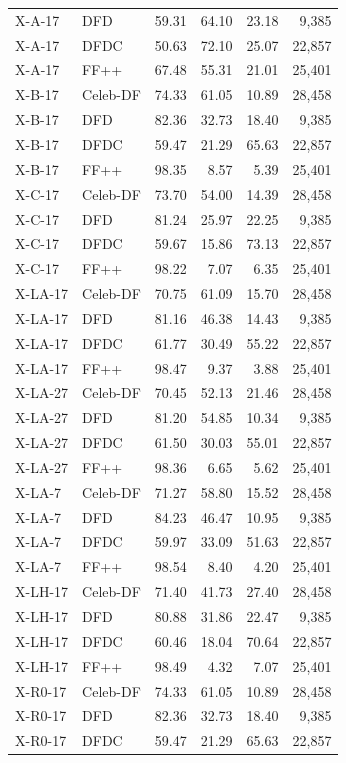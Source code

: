 \documentclass[10pt]{article}
\begin{document}
{\begin{longtable}{llrrrr}
X-A-17 & DFD & 59.31 & 64.10 & 23.18 & 9,385\\
X-A-17 & DFDC & 50.63 & 72.10 & 25.07 & 22,857\\
X-A-17 & FF++ & 67.48 & 55.31 & 21.01 & 25,401\\
X-B-17 & Celeb-DF & 74.33 & 61.05 & 10.89 & 28,458\\
X-B-17 & DFD & 82.36 & 32.73 & 18.40 & 9,385\\
X-B-17 & DFDC & 59.47 & 21.29 & 65.63 & 22,857\\
X-B-17 & FF++ & 98.35 & 8.57 & 5.39 & 25,401\\
X-C-17 & Celeb-DF & 73.70 & 54.00 & 14.39 & 28,458\\
X-C-17 & DFD & 81.24 & 25.97 & 22.25 & 9,385\\
X-C-17 & DFDC & 59.67 & 15.86 & 73.13 & 22,857\\
X-C-17 & FF++ & 98.22 & 7.07 & 6.35 & 25,401\\
X-LA-17 & Celeb-DF & 70.75 & 61.09 & 15.70 & 28,458\\
X-LA-17 & DFD & 81.16 & 46.38 & 14.43 & 9,385\\
X-LA-17 & DFDC & 61.77 & 30.49 & 55.22 & 22,857\\
X-LA-17 & FF++ & 98.47 & 9.37 & 3.88 & 25,401\\
X-LA-27 & Celeb-DF & 70.45 & 52.13 & 21.46 & 28,458\\
X-LA-27 & DFD & 81.20 & 54.85 & 10.34 & 9,385\\
X-LA-27 & DFDC & 61.50 & 30.03 & 55.01 & 22,857\\
X-LA-27 & FF++ & 98.36 & 6.65 & 5.62 & 25,401\\
X-LA-7 & Celeb-DF & 71.27 & 58.80 & 15.52 & 28,458\\
X-LA-7 & DFD & 84.23 & 46.47 & 10.95 & 9,385\\
X-LA-7 & DFDC & 59.97 & 33.09 & 51.63 & 22,857\\
X-LA-7 & FF++ & 98.54 & 8.40 & 4.20 & 25,401\\
X-LH-17 & Celeb-DF & 71.40 & 41.73 & 27.40 & 28,458\\
X-LH-17 & DFD & 80.88 & 31.86 & 22.47 & 9,385\\
X-LH-17 & DFDC & 60.46 & 18.04 & 70.64 & 22,857\\
X-LH-17 & FF++ & 98.49 & 4.32 & 7.07 & 25,401\\
X-R0-17 & Celeb-DF & 74.33 & 61.05 & 10.89 & 28,458\\
X-R0-17 & DFD & 82.36 & 32.73 & 18.40 & 9,385\\
X-R0-17 & DFDC & 59.47 & 21.29 & 65.63 & 22,857\\

\end{longtable}}
\end{document}
